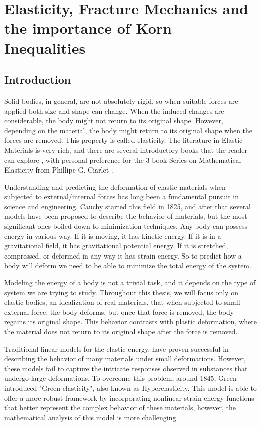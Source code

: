 \chapter{Elasticity, Fracture Mechanics and the importance of Korn Inequalities}
\label{chap:Elasticity}
\section{Introduction}

Solid bodies, in general, are not absolutely rigid, so when suitable forces are applied both size and shape can change. When the induced changes are considerable, the body might not return to its original shape. However, depending on the material, the body might return to its original shape when the forces are removed. This property is called elasticity. The literature in Elastic Materials is very rich, and there are several introductory books that the reader can explore \cite{MS1,MS2,MS3,MS4}, with personal preference for the 3 book Series on Mathematical Elasticity from Phillipe G. Ciarlet \cite{MSP,MSP2,MSP3}.

Understanding and predicting the deformation of elastic materials when subjected to external/internal forces has long been a fundamental pursuit in science and engineering. Cauchy started this field in 1825, and after that several models have been proposed to describe the behavior of materials, but the most significant ones boiled down to minimization techniques. Any body can possess energy in various way. If it is moving, it has kinetic energy. If it is in a gravitational field, it has gravitational potential energy. If it is stretched, compressed, or deformed in any way it has strain energy. So to predict how a body will deform we need to be able to minimize the total energy of the system.

Modeling the energy of a body is not a trivial task, and it depends on the type of system we are trying to study.  Throughout this thesis, we will focus only on elastic bodies, an idealization of real materials, that when subjected to small external force, the body deforms, but once that force is removed, the body regains its original shape. This behavior contrasts with plastic deformation, where the material does not return to its original shape after the force is removed. 

Traditional linear models for the elastic energy, have proven successful in describing the behavior of many materials under small deformations. However, these models fail to capture the intricate responses observed in substances that undergo large deformations. To overcome this problem, around 1845, Green introduced "Green elasticity", also known as Hyperelasticity. This model is able to offer a more robust framework by incorporating nonlinear strain-energy functions that better represent the complex behavior of these materials, however, the mathematical analysis of this model is more challenging.

